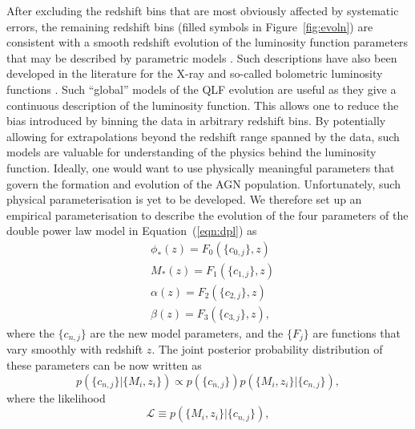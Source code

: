 \documentclass[fleqn,usenatbib]{mnras}
\begin{document}
After excluding the redshift bins that are most obviously affected by
systematic errors, the remaining redshift bins (filled symbols in
Figure~\ref{fig:evoln}) are consistent with a smooth redshift
evolution of the luminosity function parameters that may be described
by parametric models \citep{1976A&A....53...15M, 1983ApJ...269..352S,
  1988ApJ...325...92K, 1988MNRAS.235..935B, 1993ApJ...406L..43H,
  1994ApJ...421..412W, 1995AJ....110...68S, 1995AJ....110.2553K,
  1995ApJ...438..623P, 2000MNRAS.317.1014B, 2001AJ....121...54F,
  2006AJ....131.2766R, 2007A&A...472..443B, 2009MNRAS.399.1755C,
  2013ApJ...773...14R, 2013A&A...551A..29P}.  Such descriptions have
also been developed in the literature for the X-ray
\citep[e.g.,][]{2015MNRAS.451.1892A} and so-called bolometric
luminosity functions \citep[e.g.,][]{2007ApJ...654..731H}.  Such
``global'' models of the QLF evolution are useful as
they give a continuous description of the luminosity function.  This
allows one to reduce the bias introduced by binning the data in
arbitrary redshift bins.  By potentially allowing for extrapolations
beyond the redshift range spanned by the data, such models are
valuable for understanding of the physics behind the luminosity
function.  Ideally, one would want to use physically meaningful
parameters that govern the formation and evolution of the AGN
population.  Unfortunately, such physical parameterisation is yet to
be developed.  We therefore set up an empirical parameterisation to
describe the evolution of the four parameters of the double power law
model in Equation~(\ref{eqn:dpl}) as 
\begin{align}
  &\phi_*(z) = F_0(\{c_{0,j}\}, z)\nonumber\\
  &M_*(z) = F_1(\{c_{1,j}\}, z)\nonumber\\
  &\alpha(z) = F_2(\{c_{2,j}\}, z)\nonumber\\
  &\beta(z) = F_3(\{c_{3,j}\}, z),
  \label{eqn:global}
\end{align}
where the $\{c_{n,j}\}$ are the new model parameters, and the $\{F_j\}$
are functions that vary smoothly with redshift $z$.  The joint
posterior probability distribution of these parameters can be now
written as
\begin{equation}
  p(\{c_{n,j}\} | \{M_i, z_i\}) \propto p(\{c_{n,j}\})p(\{M_i, z_i\} | \{c_{n,j}\}),
\end{equation}
where the likelihood 
\begin{equation}
  \mathcal{L}\equiv p(\{M_i, z_i\} | \{c_{n,j}\}),
\end{equation}
\end{document}
